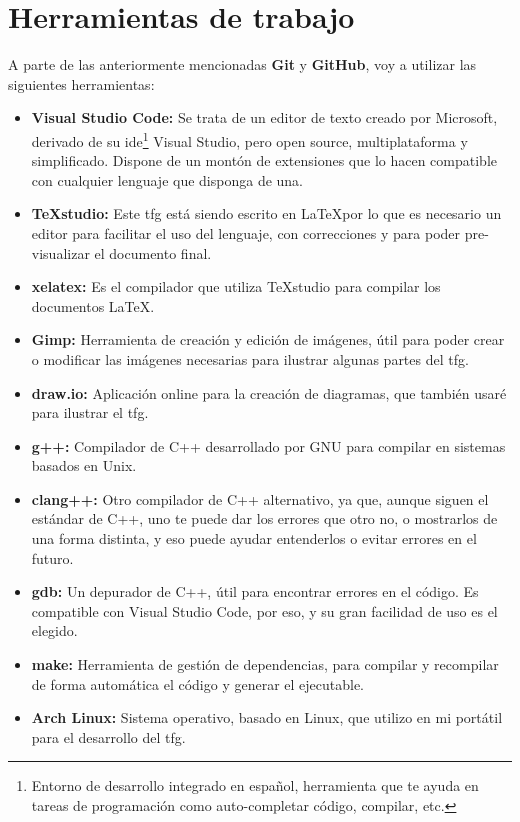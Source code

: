 \section{Herramientas de trabajo}
\label{herramientas}
A parte de las anteriormente mencionadas \textbf{Git} y \textbf{GitHub}, voy a utilizar las siguientes herramientas:
\begin{itemize}
    \item \textbf{Visual Studio Code:} Se trata de un editor de texto creado por Microsoft, derivado de su \gls{ide}\footnote{Entorno de desarrollo integrado en español, herramienta que te ayuda en tareas de programación como auto-completar código, compilar, etc.} Visual Studio, pero open source, multiplataforma y simplificado. Dispone de un montón de extensiones que lo hacen compatible con cualquier lenguaje que disponga de una.
    \item \textbf{TeXstudio:} Este \gls{tfg} está siendo escrito en \LaTeX por lo que es necesario un editor para facilitar el uso del lenguaje, con correcciones y para poder pre-visualizar el documento final.
    \item \textbf{xelatex:} Es el compilador que utiliza TeXstudio para compilar los documentos \LaTeX.
    \item \textbf{Gimp:} Herramienta de creación y edición de imágenes, útil para poder crear o modificar las imágenes necesarias para ilustrar algunas partes del \gls{tfg}.
    \item \textbf{draw.io:} Aplicación online para la creación de diagramas, que también usaré para ilustrar el \gls{tfg}.
    \item \textbf{g++:} Compilador de C++ desarrollado por GNU para compilar en sistemas basados en Unix.
    \item \textbf{clang++:} Otro compilador de C++ alternativo, ya que, aunque siguen el estándar de C++, uno te puede dar los errores que otro no, o mostrarlos de una forma distinta, y eso puede ayudar entenderlos o evitar errores en el futuro.
    \item \textbf{gdb:} Un depurador de C++, útil para encontrar errores en el código. Es compatible con Visual Studio Code, por eso, y su gran facilidad de uso es el elegido. 
    \item \textbf{make:} Herramienta de gestión de dependencias, para compilar y recompilar de forma automática el código y generar el ejecutable.
    \item \textbf{Arch Linux:} Sistema operativo, basado en Linux, que utilizo en mi portátil para el desarrollo del \gls{tfg}.
\end{itemize}